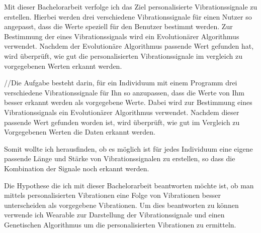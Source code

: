 

Mit dieser Bachelorarbeit verfolge ich das Ziel personalisierte Vibrationssignale zu erstellen. Hierbei werden drei verschiedene Vibrationssignale f{\"u}r einen Nutzer so angepasst, dass die Werte speziell f{\"u}r den Benutzer bestimmt werden. Zur Bestimmung der eines Vibrationssignals wird ein Evolution{\"a}rer Algorithmus verwendet. Nachdem der Evolution{\"a}re Algorithmus passende Wert gefunden hat, wird {\"u}berpr{\"u}ft, wie gut die personalisierten Vibrationssignale im vergleich zu vorgegebenen Werten erkannt werden. 


//Die Aufgabe besteht darin, f{\"u}r ein Individuum mit einem Programm drei verschiedene Vibrationssignale f{\"u}r Ihn so anzupassen, dass die Werte von Ihm besser erkannt werden als vorgegebene Werte. Dabei wird zur Bestimmung eines Vibrationssignals ein Evolution{\"a}rer Algorithmus verwendet. Nachdem dieser passende Wert gefunden worden ist, wird {\"u}berpr{\"u}ft, wie gut im Vergleich zu Vorgegebenen Werten die Daten erkannt werden.

Somit wollte ich herausfinden, ob es m{\"o}glich ist f{\"u}r jedes Individuum eine eigene passende L{\"a}nge und St{\"a}rke von Vibrationssignalen zu erstellen, so dass die Kombination der Signale noch erkannt werden.

Die Hypothese die ich mit dieser Bachelorarbeit beantworten m{\"o}chte ist, ob man mittels personalisierten Vibrationen eine Folge von Vibrationen besser unterscheiden als vorgegebene Vibrationen.
Um dies beantworten zu k{\"o}nnen verwende ich Wearable zur Darstellung der Vibrationssignale und einen Genetischen Algorithmus um die personalisierten Vibrationen zu ermitteln.
